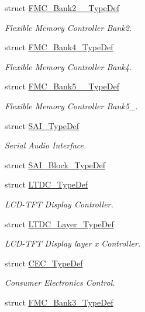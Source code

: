 \begin{DoxyCompactItemize}
struct \hyperlink{struct_f_m_c___bank2__3___type_def}{F\+M\+C\+\_\+\+Bank2\+\_\+\_\+\+Type\+Def}
\begin{DoxyCompactList}\small\item\em Flexible Memory Controller Bank2. \end{DoxyCompactList}\item 
struct \hyperlink{struct_f_m_c___bank4___type_def}{F\+M\+C\+\_\+\+Bank4\+\_\+\+Type\+Def}
\begin{DoxyCompactList}\small\item\em Flexible Memory Controller Bank4. \end{DoxyCompactList}\item 
struct \hyperlink{struct_f_m_c___bank5__6___type_def}{F\+M\+C\+\_\+\+Bank5\+\_\+\_\+\+Type\+Def}
\begin{DoxyCompactList}\small\item\em Flexible Memory Controller Bank5\+\_. \end{DoxyCompactList}\item 
struct \hyperlink{struct_s_a_i___type_def}{S\+A\+I\+\_\+\+Type\+Def}
\begin{DoxyCompactList}\small\item\em Serial Audio Interface. \end{DoxyCompactList}\item 
struct \hyperlink{struct_s_a_i___block___type_def}{S\+A\+I\+\_\+\+Block\+\_\+\+Type\+Def}
\item 
struct \hyperlink{struct_l_t_d_c___type_def}{L\+T\+D\+C\+\_\+\+Type\+Def}
\begin{DoxyCompactList}\small\item\em L\+C\+D-\/\+T\+FT Display Controller. \end{DoxyCompactList}\item 
struct \hyperlink{struct_l_t_d_c___layer___type_def}{L\+T\+D\+C\+\_\+\+Layer\+\_\+\+Type\+Def}
\begin{DoxyCompactList}\small\item\em L\+C\+D-\/\+T\+FT Display layer x Controller. \end{DoxyCompactList}\item 
struct \hyperlink{struct_c_e_c___type_def}{C\+E\+C\+\_\+\+Type\+Def}
\begin{DoxyCompactList}\small\item\em Consumer Electronics Control. \end{DoxyCompactList}\item 
struct \hyperlink{struct_f_m_c___bank3___type_def}{F\+M\+C\+\_\+\+Bank3\+\_\+\+Type\+Def}

\end{DoxyCompactItemize}
